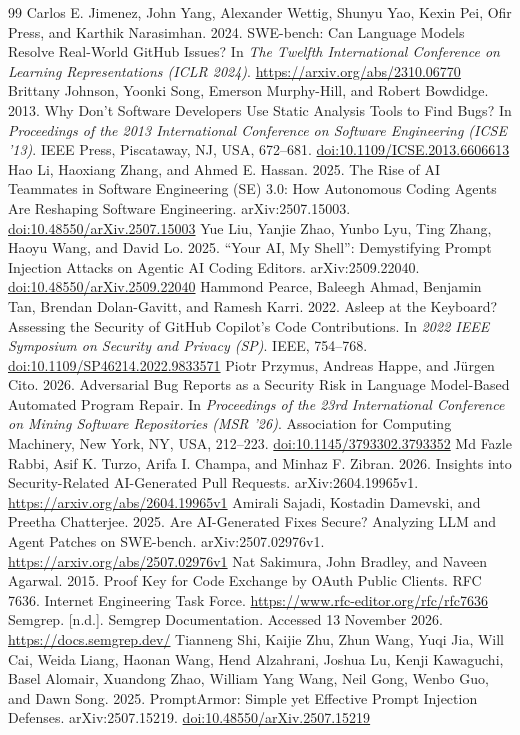 \documentclass[acmsmall,screen,nonacm,review]{acmart}
\providecommand{\doi}[1]{\href{https://doi.org/#1}{doi:#1}}
\begin{document}
\begin{thebibliography}{99}
 Carlos E. Jimenez, John Yang, Alexander Wettig, Shunyu Yao, Kexin Pei, Ofir Press, and Karthik Narasimhan. 2024. SWE-bench: Can Language Models Resolve Real-World GitHub Issues? In \emph{The Twelfth International Conference on Learning Representations (ICLR 2024)}. \url{https://arxiv.org/abs/2310.06770}
 Brittany Johnson, Yoonki Song, Emerson Murphy-Hill, and Robert Bowdidge. 2013. Why Don't Software Developers Use Static Analysis Tools to Find Bugs? In \emph{Proceedings of the 2013 International Conference on Software Engineering (ICSE '13)}. IEEE Press, Piscataway, NJ, USA, 672--681. \doi{10.1109/ICSE.2013.6606613}
 Hao Li, Haoxiang Zhang, and Ahmed E. Hassan. 2025. The Rise of AI Teammates in Software Engineering (SE) 3.0: How Autonomous Coding Agents Are Reshaping Software Engineering. arXiv:2507.15003. \doi{10.48550/arXiv.2507.15003}
 Yue Liu, Yanjie Zhao, Yunbo Lyu, Ting Zhang, Haoyu Wang, and David Lo. 2025. ``Your AI, My Shell'': Demystifying Prompt Injection Attacks on Agentic AI Coding Editors. arXiv:2509.22040. \doi{10.48550/arXiv.2509.22040}
 Hammond Pearce, Baleegh Ahmad, Benjamin Tan, Brendan Dolan-Gavitt, and Ramesh Karri. 2022. Asleep at the Keyboard? Assessing the Security of GitHub Copilot's Code Contributions. In \emph{2022 IEEE Symposium on Security and Privacy (SP)}. IEEE, 754--768. \doi{10.1109/SP46214.2022.9833571}
 Piotr Przymus, Andreas Happe, and J\"urgen Cito. 2026. Adversarial Bug Reports as a Security Risk in Language Model-Based Automated Program Repair. In \emph{Proceedings of the 23rd International Conference on Mining Software Repositories (MSR '26)}. Association for Computing Machinery, New York, NY, USA, 212--223. \doi{10.1145/3793302.3793352}
 Md Fazle Rabbi, Asif K. Turzo, Arifa I. Champa, and Minhaz F. Zibran. 2026. Insights into Security-Related AI-Generated Pull Requests. arXiv:2604.19965v1. \url{https://arxiv.org/abs/2604.19965v1}
 Amirali Sajadi, Kostadin Damevski, and Preetha Chatterjee. 2025. Are AI-Generated Fixes Secure? Analyzing LLM and Agent Patches on SWE-bench. arXiv:2507.02976v1. \url{https://arxiv.org/abs/2507.02976v1}
 Nat Sakimura, John Bradley, and Naveen Agarwal. 2015. Proof Key for Code Exchange by OAuth Public Clients. RFC 7636. Internet Engineering Task Force. \url{https://www.rfc-editor.org/rfc/rfc7636}
 Semgrep. [n.d.]. Semgrep Documentation. Accessed 13 November 2026. \url{https://docs.semgrep.dev/}
 Tianneng Shi, Kaijie Zhu, Zhun Wang, Yuqi Jia, Will Cai, Weida Liang, Haonan Wang, Hend Alzahrani, Joshua Lu, Kenji Kawaguchi, Basel Alomair, Xuandong Zhao, William Yang Wang, Neil Gong, Wenbo Guo, and Dawn Song. 2025. PromptArmor: Simple yet Effective Prompt Injection Defenses. arXiv:2507.15219. \doi{10.48550/arXiv.2507.15219}

\end{thebibliography}
\end{document}
